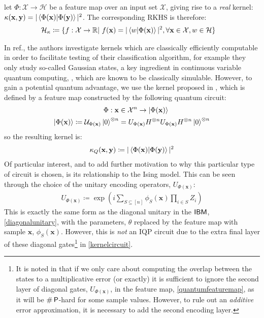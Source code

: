 \begin{theorem}
let $\Phi:\mathcal{X}\rightarrow \mathcal{H}$ be a feature map over an input set $\mathcal{X}$, giving rise to a \emph{real} kernel: $\kappa(\mathbf{x}, \mathbf{y}) = |\braket{\Phi(\mathbf{x})|\Phi(\mathbf{y})}|^2$. The corresponding RKHS is therefore:
\begin{align}
    \mathcal{H}_\kappa  \coloneqq \{&f:\mathcal{X} \rightarrow \mathbb{R}|\ f(\mathbf{x}) = |\braket{w|\Phi(\mathbf{x})}|^2, \forall \mathbf{x} \in \mathcal{X}, w\in \mathcal{H}\} \nonumber
\end{align}
\end{theorem}


In ref., the authors investigate kernels which are classically efficiently computable in order to facilitate testing of their classification algorithm, for example they only study so-called Gaussian states, a key ingredient in continuous variable quantum computing, , which are known to be classically simulable. However, to gain a potential quantum advantage, we use the kernel proposed in , which is defined by a feature map constructed by the following quantum circuit:
\begin{align}
    \Phi: \mathbf{x} &\in \mathcal{X}^n \rightarrow \ket{\Phi(\mathbf{x})} \label{quantumfeaturemap}\\
    \ket{\Phi(\mathbf{x})}  \coloneqq \mathcal{U}_{\Phi(\mathbf{x})}\ket{0}^{\otimes n} &= U_{\Phi(\mathbf{x})}H^{\otimes n}U_{\Phi(\mathbf{x})}H^{\otimes n}\ket{0}^{\otimes n} \label{kernelcircuit}
\end{align}
so the resulting kernel is:
\begin{align}
    \kappa_Q(\mathbf{x}, \mathbf{y})  \coloneqq |\braket{\Phi(\mathbf{x})|\Phi(\mathbf{y})}|^2 \label{quantumkernel_app}
\end{align}
Of particular interest, and to add further motivation to why this particular type of circuit is chosen, is its relationship to the Ising model. This can be seen through the choice of the unitary encoding operators, $U_{\Phi(\mathbf{x})}$:
\begin{align}
U_{\Phi(\mathbf{x})}  \coloneqq \exp\left(i\sum\limits_{S\subseteq [n]}\phi_S(\mathbf{x})\prod\limits_{i \in S}Z_i\right) \label{kernelcircuitunitary}
\end{align}
This is exactly the same form as the diagonal unitary in the $\textsf{IBM}$, \eqref{diagonalunitary}, with the parameters, $\theta$ replaced by the feature map with sample $\mathbf{x}$, $\phi_S(\mathbf{x})$. However, this is \emph{not} an \textsf{IQP} circuit due to the extra final layer of these diagonal gates\footnote{It is noted in  that if we only care about computing the overlap between the states to a multiplicative error (or exactly) it is sufficient to ignore the second layer of diagonal gates, $U_{\Phi(\mathbf{x})}$, in the feature map, \eqref{quantumfeaturemap}, as it will be $\#\operatorname{\textsf{P}}$-hard for some sample values. However, to rule out an \emph{additive} error approximation, it is necessary to add the second encoding layer.} in \eqref{kernelcircuit}. 


